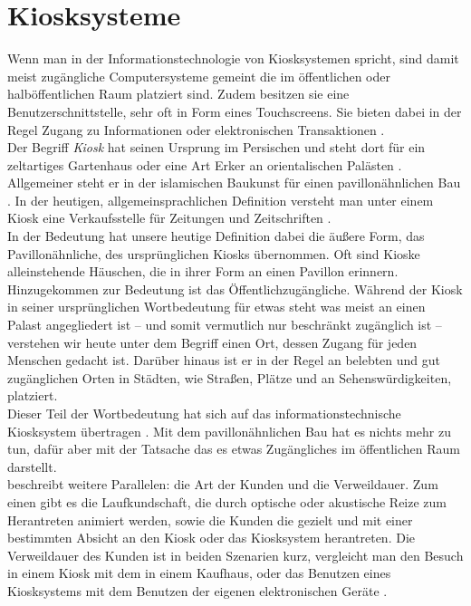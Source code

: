 \section{Kiosksysteme}
\label{sec:kiosk}

Wenn man in der Informationstechnologie von Kiosksystemen spricht,
sind damit meist zugängliche Computersysteme gemeint die im öffentlichen oder halböffentlichen 
Raum platziert sind. Zudem besitzen sie eine Benutzerschnittstelle, sehr oft in Form
eines Touchscreens. Sie bieten dabei in der Regel Zugang zu Informationen 
oder elektronischen Transaktionen \cite{retailing}.\\

Der Begriff \emph{Kiosk} hat seinen Ursprung im Persischen und steht dort für
ein zeltartiges Gartenhaus oder eine Art Erker an orientalischen Palästen \cite{meyers}.
Allgemeiner steht er in der islamischen Baukunst für einen pavillonähnlichen Bau \cite{taschenlexikon}.
In der heutigen, allgemeinsprachlichen Definition versteht man unter einem Kiosk eine Verkaufsstelle
für Zeitungen und Zeitschriften \cite{taschenlexikon, meyers}.\\
In der Bedeutung hat unsere heutige Definition dabei die äußere Form, das Pavillonähnliche, 
des ursprünglichen Kiosks übernommen. Oft sind Kioske alleinstehende Häuschen, die in ihrer Form
an einen Pavillon erinnern. Hinzugekommen zur Bedeutung ist das Öffentlichzugängliche. Während der Kiosk 
in seiner ursprünglichen Wortbedeutung für etwas steht was meist an einen Palast angegliedert ist -- und 
somit vermutlich nur beschränkt zugänglich ist -- verstehen wir heute unter dem Begriff einen Ort, dessen Zugang
für jeden Menschen gedacht ist. Darüber hinaus ist er in der Regel an belebten und gut zugänglichen Orten 
in Städten, wie Straßen, Plätze und an Sehenswürdigkeiten, platziert.\\
Dieser Teil der Wortbedeutung hat sich auf das informationstechnische Kiosksystem übertragen \cite{multimediale}. Mit dem 
pavillonähnlichen Bau hat es nichts mehr zu tun, dafür aber mit der Tatsache das es etwas Zugängliches 
im öffentlichen Raum darstellt.\\
 beschreibt weitere Parallelen: die Art der Kunden und 
die Verweildauer. Zum einen gibt es die Laufkundschaft, die durch optische oder akustische Reize
zum Herantreten animiert werden, sowie die Kunden die gezielt und mit einer bestimmten Absicht an den Kiosk
oder das Kiosksystem herantreten. Die Verweildauer des Kunden ist in beiden Szenarien kurz, 
vergleicht man den Besuch in einem Kiosk mit dem in einem Kaufhaus, oder das Benutzen eines Kiosksystems
mit dem Benutzen der eigenen elektronischen Geräte \cite{multimediale}.\\

